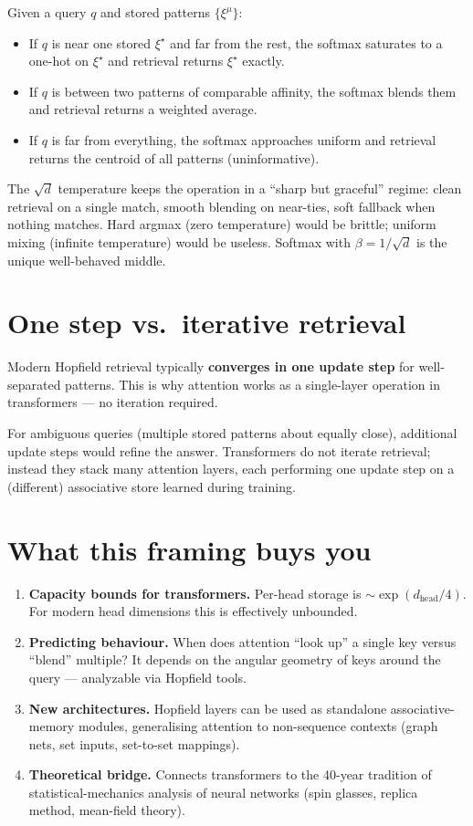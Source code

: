 \documentclass[11pt,a4paper]{article}
\begin{document}
Given a query $q$ and stored patterns $\{\xi^\mu\}$:

\begin{itemize}
\item If $q$ is near one stored $\xi^{\star}$ and far from the rest, the
    softmax saturates to a one-hot on $\xi^{\star}$ and retrieval returns
    $\xi^{\star}$ exactly.
\item If $q$ is between two patterns of comparable affinity, the softmax
    blends them and retrieval returns a weighted average.
\item If $q$ is far from everything, the softmax approaches uniform and
    retrieval returns the centroid of all patterns (uninformative).
\end{itemize}

The $\sqrt{d}$ temperature keeps the operation in a ``sharp but
graceful'' regime: clean retrieval on a single match, smooth blending
on near-ties, soft fallback when nothing matches. Hard argmax (zero
temperature) would be brittle; uniform mixing (infinite temperature)
would be useless. Softmax with $\beta = 1/\sqrt{d}$ is the unique
well-behaved middle.

\section{One step vs.\ iterative retrieval}

Modern Hopfield retrieval typically \textbf{converges in one update
step} for well-separated patterns. This is why attention works as a
single-layer operation in transformers --- no iteration required.

For ambiguous queries (multiple stored patterns about equally close),
additional update steps would refine the answer. Transformers do not
iterate retrieval; instead they stack many attention layers, each
performing one update step on a (different) associative store learned
during training.

\section{What this framing buys you}

\begin{enumerate}
\item \textbf{Capacity bounds for transformers.} Per-head storage is
    $\sim \exp(d_{\text{head}}/4)$. For modern head dimensions this is
    effectively unbounded.
\item \textbf{Predicting behaviour.} When does attention ``look up'' a
    single key versus ``blend'' multiple? It depends on the angular
    geometry of keys around the query --- analyzable via Hopfield tools.
\item \textbf{New architectures.} Hopfield layers can be used as
    standalone associative-memory modules, generalising attention to
    non-sequence contexts (graph nets, set inputs, set-to-set mappings).
\item \textbf{Theoretical bridge.} Connects transformers to the
    40-year tradition of statistical-mechanics analysis of neural
    networks (spin glasses, replica method, mean-field theory).
\end{enumerate}
\end{document}
